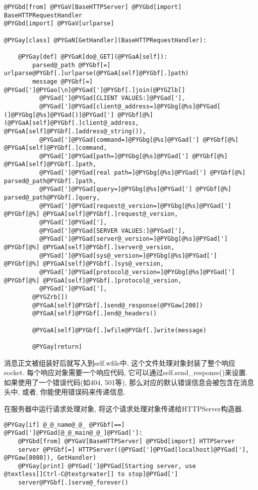 \documentclass[a4paper,10pt,english]{manual}
\begin{document}
\begin{Verbatim}[commandchars=@\[\]]
@PYGbd[from] @PYGaV[BaseHTTPServer] @PYGbd[import] BaseHTTPRequestHandler
@PYGbd[import] @PYGaV[urlparse]

@PYGay[class] @PYGaN[GetHandler](BaseHTTPRequestHandler):

    @PYGay[def] @PYGaK[do@_GET](@PYGaA[self]):
        parsed@_path @PYGbf[=] urlparse@PYGbf[.]urlparse(@PYGaA[self]@PYGbf[.]path)
        message @PYGbf[=] @PYGad[']@PYGao[\n]@PYGad[']@PYGbf[.]join(@PYGZlb[]
          @PYGad[']@PYGad[CLIENT VALUES:]@PYGad['],
          @PYGad[']@PYGad[client@_address=]@PYGbg[@%s]@PYGad[ (]@PYGbg[@%s]@PYGad[)]@PYGad['] @PYGbf[@%] (@PYGaA[self]@PYGbf[.]client@_address, @PYGaA[self]@PYGbf[.]address@_string()),
          @PYGad[']@PYGad[command=]@PYGbg[@%s]@PYGad['] @PYGbf[@%] @PYGaA[self]@PYGbf[.]command,
          @PYGad[']@PYGad[path=]@PYGbg[@%s]@PYGad['] @PYGbf[@%] @PYGaA[self]@PYGbf[.]path,
          @PYGad[']@PYGad[real path=]@PYGbg[@%s]@PYGad['] @PYGbf[@%] parsed@_path@PYGbf[.]path,
          @PYGad[']@PYGad[query=]@PYGbg[@%s]@PYGad['] @PYGbf[@%] parsed@_path@PYGbf[.]query,
          @PYGad[']@PYGad[request@_version=]@PYGbg[@%s]@PYGad['] @PYGbf[@%] @PYGaA[self]@PYGbf[.]request@_version,
          @PYGad[']@PYGad['],
          @PYGad[']@PYGad[SERVER VALUES:]@PYGad['],
          @PYGad[']@PYGad[server@_version=]@PYGbg[@%s]@PYGad['] @PYGbf[@%] @PYGaA[self]@PYGbf[.]server@_version,
          @PYGad[']@PYGad[sys@_version=]@PYGbg[@%s]@PYGad['] @PYGbf[@%] @PYGaA[self]@PYGbf[.]sys@_version,
          @PYGad[']@PYGad[protocol@_version=]@PYGbg[@%s]@PYGad['] @PYGbf[@%] @PYGaA[self]@PYGbf[.]protocol@_version,
          @PYGad[']@PYGad['],
        @PYGZrb[])
        @PYGaA[self]@PYGbf[.]send@_response(@PYGaw[200])
        @PYGaA[self]@PYGbf[.]end@_headers()

        @PYGaA[self]@PYGbf[.]wfile@PYGbf[.]write(message)

        @PYGay[return]
\end{Verbatim}

消息正文被组装好后就写入到self.wfile中, 这个文件处理对象封装了整个响应socket. 每个响应对象需要一个响应代码, 它可以通过self.send\_response()来设置. 如果使用了一个错误代码(如404, 501等), 那么对应的默认错误信息会被包含在消息头中, 或者, 你能使用错误码来传递信息.

在服务器中运行请求处理对象, 将这个请求处理对象传递给HTTPServer构造器.

\begin{Verbatim}[commandchars=@\[\]]
@PYGay[if] @_@_name@_@_ @PYGbf[==] @PYGad[']@PYGad[@_@_main@_@_]@PYGad[']:
    @PYGbd[from] @PYGaV[BaseHTTPServer] @PYGbd[import] HTTPServer
    server @PYGbf[=] HTTPServer((@PYGad[']@PYGad[localhost]@PYGad['], @PYGaw[8080]), GetHandler)
    @PYGay[print] @PYGad[']@PYGad[Starting server, use @textless[]Ctrl-C@textgreater[] to stop]@PYGad[']
    server@PYGbf[.]serve@_forever()
\end{Verbatim}
\end{document}
